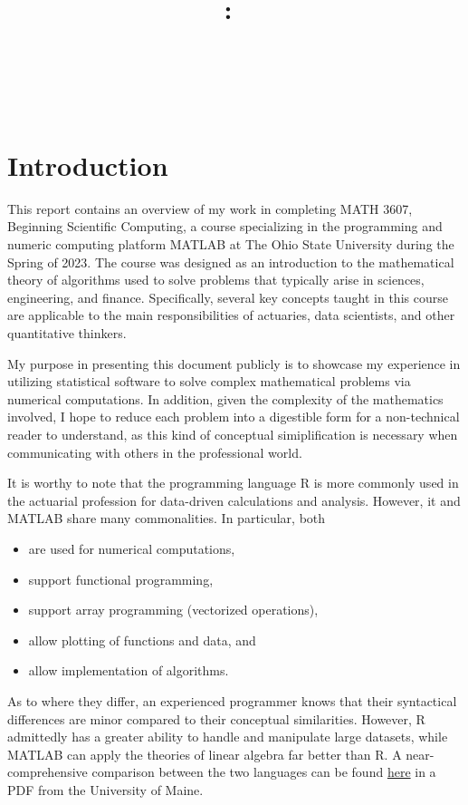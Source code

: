 \documentclass[letterpaper,12pt]{article}
\title{
    \vspace{2in}
    \textmd{\textbf{\Class:\ \\ \Title}}\\
    \vspace{3in}
}
\author{\AuthorName \vspace{2pt}\\ \textit{\ClassInstructor}}
\date{}
\begin{document}
\maketitle
\pagebreak

\section*{Introduction}
This report contains an overview of my work in completing MATH 3607, Beginning Scientific Computing, a course specializing in the programming and numeric computing platform MATLAB at The Ohio State University during the Spring of 2023.  The course was designed as an introduction to the mathematical theory of algorithms used to solve problems that typically arise in sciences, engineering, and finance.  Specifically, several key concepts taught in this course are applicable to the main responsibilities of actuaries, data scientists, and other quantitative thinkers. 

My purpose in presenting this document publicly is to showcase my experience in utilizing statistical software to solve complex mathematical problems via numerical computations.  In addition, given the complexity of the mathematics involved, I hope to reduce each problem into a digestible form for a non-technical reader to understand, as this kind of conceptual simiplification is necessary when communicating with others in the professional world.

It is worthy to note that the programming language R is more commonly used in the actuarial profession for data-driven calculations and analysis. However, it and MATLAB share many commonalities. In particular, both
\begin{itemize}
	\item are used for numerical computations,
	\item support functional programming,
	\item support array programming (vectorized operations),
	\item allow plotting of functions and data, and
	\item allow implementation of algorithms.
\end{itemize}

As to where they differ, an experienced programmer knows that their syntactical differences are minor compared to their conceptual similarities.  However, R admittedly has a greater ability to handle and manipulate large datasets, while MATLAB can apply the theories of linear algebra far better than R.  A near-comprehensive comparison between the two languages can be found \href{https://cran.r-project.org/doc/contrib/Hiebeler-matlabR.pdf}{here} in a PDF from the University of Maine.
\end{document}
